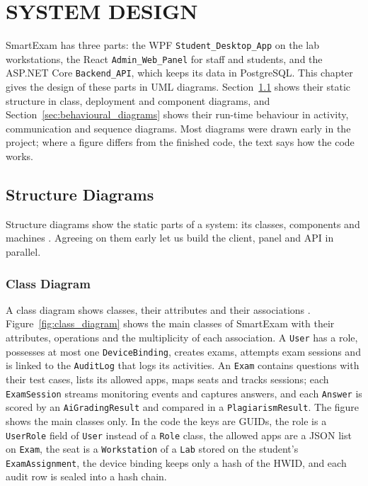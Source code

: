 \chapter{SYSTEM DESIGN}
\label{chap:system_design}

SmartExam has three parts: the WPF \texttt{Student\_Desktop\_App} on the lab workstations, the React \texttt{Admin\_Web\_Panel} for staff and students, and the ASP.NET Core \texttt{Backend\_API}, which keeps its data in PostgreSQL. This chapter gives the design of these parts in UML diagrams. Section~\ref{sec:structure_diagrams} shows their static structure in class, deployment and component diagrams, and Section~\ref{sec:behavioural_diagrams} shows their run-time behaviour in activity, communication and sequence diagrams. Most diagrams were drawn early in the project; where a figure differs from the finished code, the text says how the code works.

\section{Structure Diagrams}
\label{sec:structure_diagrams}
Structure diagrams show the static parts of a system: its classes, components and machines \cite[Annex~A]{omg_uml251}. Agreeing on them early let us build the client, panel and API in parallel.

\subsection{Class Diagram}
A class diagram shows classes, their attributes and their associations \cite{class_diagram_uml, class_diagram_sparx}. Figure~\ref{fig:class_diagram} shows the main classes of SmartExam with their attributes, operations and the multiplicity of each association. A \texttt{User} has a role, possesses at most one \texttt{DeviceBinding}, creates exams, attempts exam sessions and is linked to the \texttt{AuditLog} that logs its activities. An \texttt{Exam} contains questions with their test cases, lists its allowed apps, maps seats and tracks sessions; each \texttt{ExamSession} streams monitoring events and captures answers, and each \texttt{Answer} is scored by an \texttt{AiGradingResult} and compared in a \texttt{PlagiarismResult}. The figure shows the main classes only. In the code the keys are GUIDs, the role is a \texttt{UserRole} field of \texttt{User} instead of a \texttt{Role} class, the allowed apps are a JSON list on \texttt{Exam}, the seat is a \texttt{Workstation} of a \texttt{Lab} stored on the student's \texttt{ExamAssignment}, the device binding keeps only a hash of the HWID, and each audit row is sealed into a hash chain.

